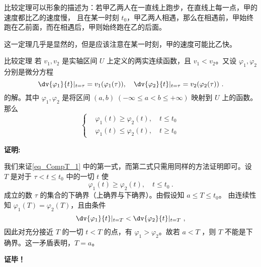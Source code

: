 比较定理可以形象的描述为：若甲乙两人在一直线上跑步，在直线上每一点，甲的速度都比乙的速度慢， 且在某一时刻 $t_0$，甲乙两人相遇，那么在相遇前，甲始终跑在乙前面，而在相遇后，甲则始终跑在乙的后面。

这一定理几乎是显然的，但是应该注意在某一时刻，甲的速度可能比乙快。
\begin{theorem}{比较定理}
若 $v_1,v_2$ 是实轴区间 $U$ 上定义的两实连续函数，且 $v_1<v_2$。又设 $\varphi_1,\varphi_2$ 分别是微分方程
\begin{equation}
\dv{\varphi_1}{t}|_{t=\tau}=v_1(\varphi_1(\tau)), \quad \dv{\varphi_2}{t}|_{t=\tau}=v_2(\varphi_2(\tau))~.
\end{equation}
的解。其中 $\varphi_1,\varphi_2$ 是将区间 $(a,b)\;(-\infty\leq a<b\leq+\infty)$ 映射到 $U$ 上的函数。那么
\begin{equation}\label{eq_CompT_1}
\left\{\begin{aligned}
    &\varphi_1(t)\geq\varphi_2(t),\quad t\leq t_0\\
    &\varphi_1(t)\leq\varphi_2(t),\quad t\geq t_0
\end{aligned}\right.~
\end{equation}

\end{theorem} 
\textbf{证明:}

我们来证\autoref{eq_CompT_1} 中的第一式，而第二式只需用同样的方法证明即可。设 $T$ 是对于 $\tau<t\leq t_0$ 中的一切 $t$ 使
\begin{equation}
\varphi_1(t)\geq\varphi_2(t),\quad t\leq t_0~.
\end{equation}
成立的数 $\tau$ 的集合的下确界（上确界与下确界）。由假设知 $a\leq T\leq t_0$。
由连续性知 $\varphi_1(T)=\varphi_2(T)$，且由条件
\begin{equation}
\dv{\varphi_1}{t}|_{t=T}<\dv{\varphi_2}{t}|_{t=T}~,
\end{equation}
因此对充分接近 $T$ 的一切 $t<T$ 的点，有 $\varphi_1>\varphi_2$。故若 $a<T$ ，则 $T$ 不能是下确界。这一矛盾表明，$T=a$。

\textbf{证毕！}
